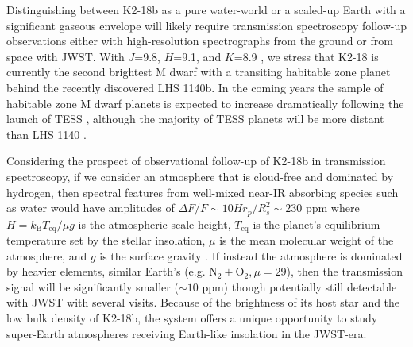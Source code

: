Distinguishing between K2-18b as a pure water-world or a scaled-up Earth with a significant gaseous
envelope will likely require transmission spectroscopy follow-up observations either with high-resolution
spectrographs from the ground 
or from space with JWST. With $J$=9.8, $H$=9.1, and $K$=8.9 \citep{cutri03},
we stress that K2-18 is currently the second brightest M dwarf with a transiting
habitable zone planet behind the recently discovered LHS 1140b. In the coming years the sample of
habitable zone M dwarf planets is expected to increase dramatically following the launch of TESS
\citep{ricker14}, although the majority of TESS planets will be more distant than LHS 1140 \citep{sullivan15}.

Considering the prospect of observational follow-up of K2-18b in transmission spectroscopy, if we
consider an atmosphere that is
cloud-free and dominated by hydrogen, then spectral features from well-mixed near-IR absorbing species
such as water would have amplitudes of $\Delta F/F \sim 10H r_p/R_s^2 \sim 230$ ppm where
$H=k_{\text{B}}T_{\text{eq}}/\mu g$ is the atmospheric scale height, $T_{\text{eq}}$ is the planet's equilibrium
temperature set by the stellar insolation, $\mu$ is the mean molecular weight of the atmosphere, and $g$ is the
surface gravity \citep{millerricci09, kaltenegger09}. If instead the atmosphere is dominated
by heavier elements, similar Earth's (e.g. $\text{N}_2 + \text{O}_2, \mu=29$),
then the transmission signal will be significantly smaller ($\sim 10$ ppm) though potentially
still detectable with JWST with several visits. Because of the brightness of its host star and the low bulk
density of K2-18b, the system offers a unique opportunity to study super-Earth atmospheres receiving
Earth-like insolation in the JWST-era.


